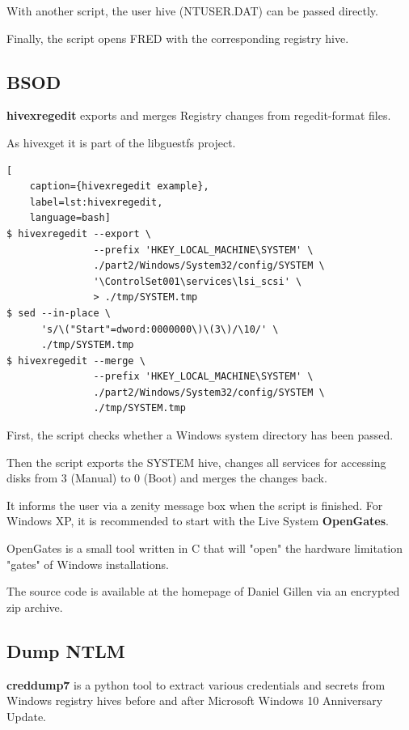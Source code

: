 With another script, the user hive (NTUSER.DAT) can be passed directly.

Finally, the script opens FRED with the corresponding registry hive.

\subsection{BSOD}

\textbf{hivexregedit} exports and merges Registry changes from regedit-format files.

As hivexget it is part of the libguestfs project.

\begin{lstlisting}[
    caption={hivexregedit example},
    label=lst:hivexregedit,
    language=bash]
$ hivexregedit --export \
               --prefix 'HKEY_LOCAL_MACHINE\SYSTEM' \
               ./part2/Windows/System32/config/SYSTEM \
               '\ControlSet001\services\lsi_scsi' \
               > ./tmp/SYSTEM.tmp
$ sed --in-place \
      's/\("Start"=dword:0000000\)\(3\)/\10/' \
      ./tmp/SYSTEM.tmp
$ hivexregedit --merge \
               --prefix 'HKEY_LOCAL_MACHINE\SYSTEM' \
               ./part2/Windows/System32/config/SYSTEM \
               ./tmp/SYSTEM.tmp
\end{lstlisting}

\noindent First, the script checks whether a Windows system directory has been passed.

Then the script exports the SYSTEM hive, changes all services for accessing disks from 3 (Manual) to 0 (Boot) \cite{WindowsServiceStartMode} and merges the changes back.

It informs the user via a zenity message box when the script is finished.\newline
\newline
\noindent For Windows XP, it is recommended to start with the Live System \textbf{OpenGates}.

OpenGates is a small tool written in C that will "open" the hardware limitation "gates" of Windows installations.

The source code is available at the homepage of Daniel Gillen \cite{OpenGates} via an encrypted zip archive.

\subsection{Dump NTLM}

\textbf{creddump7} is a python tool to extract various credentials and secrets from Windows registry hives before and after Microsoft Windows 10 Anniversary Update.

